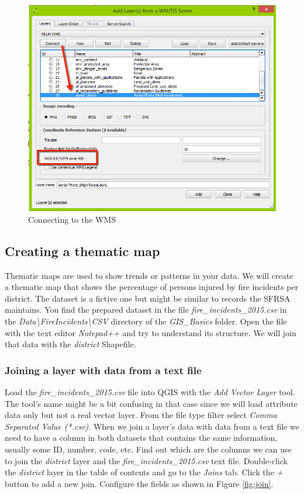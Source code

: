 \documentclass[a4paper,12pt,titlepage]{article}
\begin{document}
\begin{figure}[h]
\centering
\includegraphics[width=12cm]{Images/wms2.png}
\caption{Connecting to the WMS}\label{fig:wms2}
\end{figure}

\subsection{Creating a thematic map}

Thematic maps are used to show trends or patterns in your data. We will create a thematic map that shows the percentage of  persons injured by fire incidents per district. The dataset is a fictive one but might be similar to records the SFRSA maintains. You find the prepared dataset in the file \textit{fire\_incidents\_2015.csv} in the \textit{Data\textbackslash FireIncidents\textbackslash CSV} directory of the \textit{GIS\_Basics} folder. Open the file with the text editor \textit{Notepad++} and try to understand its structure. We will join that data with the \textit{district} Shapefile.

\subsubsection{Joining a layer with data from a text file}
Load the \textit{fire\_incidents\_2015.csv} file into QGIS with the \textit{Add Vector Layer} tool. The tool's name might be a bit confusing in that case since we will load attribute data only but not a real vector layer. From the file type filter select \textit{Comma Separated Value (*.csv)}. When we join a layer's data with data from a text file we need to have a column in both datasets that contains the same information, usually some ID, number, code, etc. Find out which are the columns we can use to join the \textit{district} layer and the \textit{fire\_incidents\_2015.csv} text file.
Double-click the \textit{district} layer in the table of contents and go to the \textit{Joins} tab. Click the \textit{+} button to add a new join. Configure the fields as shown in Figure \ref{fig:join}.
\end{document}
